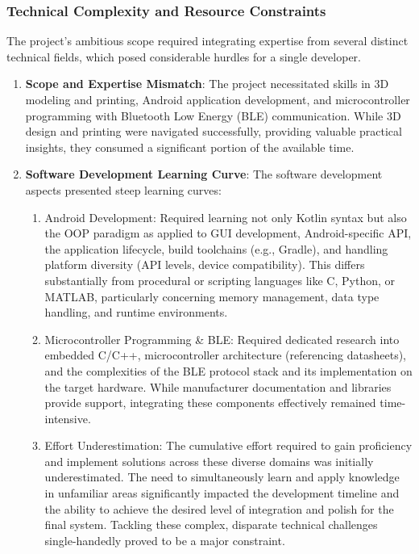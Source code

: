 \subsubsection{Technical Complexity and Resource Constraints}

The project's ambitious scope required integrating expertise from several distinct technical fields, which posed considerable hurdles for a single developer.
\begin{enumerate}
	\item \textbf{Scope and Expertise Mismatch}: The project necessitated skills in 3D modeling and printing, Android application development, and microcontroller programming with Bluetooth Low Energy (BLE) communication. While 3D design and printing were navigated successfully, providing valuable practical insights, they consumed a significant portion of the available time.
	\item \textbf{Software Development Learning Curve}: The software development aspects presented steep learning curves:
	\begin{enumerate}
		\item Android Development: Required learning not only Kotlin syntax but also the \ac{OOP} paradigm as applied to GUI development, Android-specific \ac{API}, the application lifecycle, build toolchains (e.g., Gradle), and handling platform diversity (\ac{API} levels, device compatibility). This differs substantially from procedural or scripting languages like C, Python, or MATLAB, particularly concerning memory management, data type handling, and runtime environments.
		
		\item Microcontroller Programming \& \ac{BLE}: Required dedicated research into embedded C/C++, microcontroller architecture (referencing datasheets), and the complexities of the BLE protocol stack and its implementation on the target hardware. While manufacturer documentation and libraries provide support, integrating these components effectively remained time-intensive.
		
		\item Effort Underestimation: The cumulative effort required to gain proficiency and implement solutions across these diverse domains was initially underestimated. The need to simultaneously learn and apply knowledge in unfamiliar areas significantly impacted the development timeline and the ability to achieve the desired level of integration and polish for the final system. Tackling these complex, disparate technical challenges single-handedly proved to be a major constraint.
	\end{enumerate}
\end{enumerate}
\newpage
